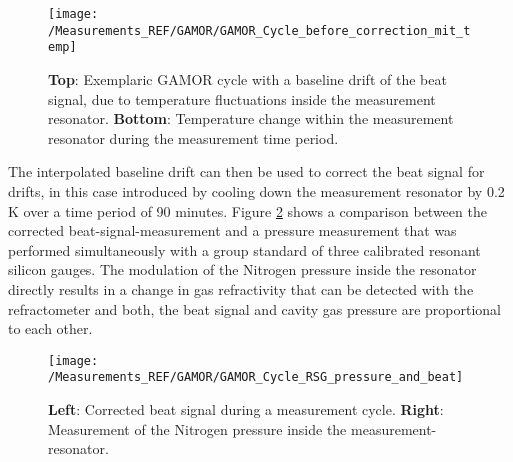 \begin{figure}[H]
		\centering 
		\texttt{[image: /Measurements\_REF/GAMOR/GAMOR\_Cycle\_before\_correction\_mit\_temp]}
		\caption{\textbf{Top}: Exemplaric GAMOR cycle with a baseline drift  of the beat signal, due to temperature fluctuations inside the measurement resonator. \textbf{Bottom}: Temperature change within the measurement resonator during the measurement time period.}
		\label{fig:GAMOR_Cycle_before_correction}
\end{figure}
\noindent
The interpolated baseline drift can then be used to correct the beat signal for drifts, in this case introduced by cooling down the measurement resonator by 0.2 K over a time period of 90 minutes. Figure \ref{fig:GAMOR_Cycle_after_correction} shows a comparison between the corrected beat-signal-measurement and a pressure measurement that was performed simultaneously with a group standard of three calibrated resonant silicon gauges. The modulation of the Nitrogen pressure inside the resonator directly results in a change in gas refractivity that can be detected with the refractometer and both, the beat signal and cavity gas pressure are proportional to each other.
\begin{figure}[H]
	\centering
	\texttt{[image: /Measurements\_REF/GAMOR/GAMOR\_Cycle\_RSG\_pressure\_and\_beat]}
	\caption{\textbf{Left}: Corrected beat signal during a measurement cycle.
	\textbf{Right}: Measurement of the Nitrogen pressure inside the measurement-resonator.}
	\label{fig:GAMOR_Cycle_after_correction}
\end{figure}
